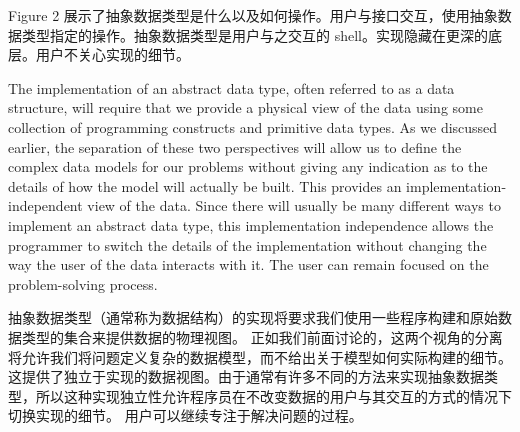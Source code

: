 Figure 2 展示了抽象数据类型是什么以及如何操作。用户与接口交互，使用抽象数据类型指定的操作。抽象数据类型是用户与之交互的 shell。实现隐藏在更深的底层。用户不关心实现的细节。 



The implementation of an abstract data type, often referred to as a data structure, will require that we provide a physical view of the data using some collection of programming constructs and primitive data types. As we discussed earlier, the separation of these two perspectives will allow us to define the complex data models for our problems without giving any indication as to the details of how the model will actually be built. This provides an implementation-independent view of the data. Since there will usually be many different ways to implement an abstract data type, this implementation independence allows the programmer to switch the details of the implementation without changing the way the user of the data interacts with it. The user can remain focused on the problem-solving process.


抽象数据类型（通常称为数据结构）的实现将要求我们使用一些程序构建和原始数据类型的集合来提供数据的物理视图。 正如我们前面讨论的，这两个视角的分离将允许我们将问题定义复杂的数据模型，而不给出关于模型如何实际构建的细节。 这提供了独立于实现的数据视图。由于通常有许多不同的方法来实现抽象数据类型，所以这种实现独立性允许程序员在不改变数据的用户与其交互的方式的情况下切换实现的细节。 用户可以继续专注于解决问题的过程。

